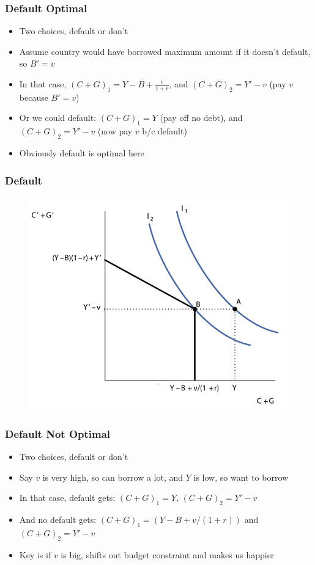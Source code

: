 \documentclass{beamer}
\begin{document}
\begin{frame}
\frametitle[alignment=center]{Default Optimal}
\begin{itemize}
\item Two choices, default or don't
\bigskip
\item Assume country would have borrowed maximum amount if it doesn't default, so $B'=v$
\bigskip
\item In that case, $(C+G)_1=Y-B+\frac{v}{1+r}$, and $(C+G)_2=Y'-v$ (pay $v$ because $B'=v$)
\bigskip
\item Or we could default:  $(C+G)_1=Y$ (pay off no debt), and $(C+G)_2=Y'-v$ (now pay $v$ b/c default)
\bigskip
\item Obviously default is optimal here
\end{itemize}
\end{frame}



\begin{frame}
\frametitle[alignment=center]{Default}
\begin{figure}
\centering
\includegraphics[scale=0.7]{Figures/W_Fig_16pt3.png}
\end{figure}
\end{frame}


\begin{frame}
\frametitle[alignment=center]{Default Not Optimal}
\begin{itemize}
\item Two choices, default or don't
\bigskip
\item Say $v$ is very high, so can borrow a lot, and $Y$ is low, so want to borrow
\bigskip
\item In that case, default gets: $(C+G)_1=Y$, $(C+G)_2=Y'-v$
\bigskip
\item And no default gets: $(C+G)_1=(Y-B+v/(1+r))$ and $(C+G)_2=Y'-v$
\bigskip
\item Key is if $v$ is big, shifts out budget constraint and makes us happier
\end{itemize}
\end{frame}
\end{document}
